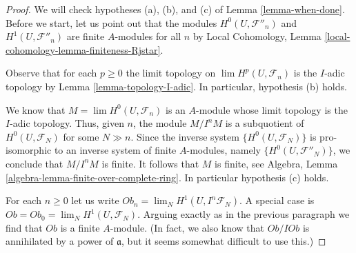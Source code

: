\begin{proof}
We will check hypotheses (a), (b), and (c) of Lemma \ref{lemma-when-done}.
Before we start, let us point out that the modules
$H^0(U, \mathcal{F}''_n)$ and $H^1(U, \mathcal{F}''_n)$
are finite $A$-modules for all $n$ by
Local Cohomology, Lemma \ref{local-cohomology-lemma-finiteness-Rjstar}.

\medskip\noindent
Observe that for each $p \geq 0$
the limit topology on $\lim H^p(U, \mathcal{F}_n)$
is the $I$-adic topology by Lemma \ref{lemma-topology-I-adic}.
In particular, hypothesis (b) holds.

\medskip\noindent
We know that $M = \lim H^0(U, \mathcal{F}_n)$ is an $A$-module whose
limit topology is the $I$-adic topology. Thus, given $n$, the module
$M/I^nM$ is a subquotient of $H^0(U, \mathcal{F}_N)$ for some $N \gg n$.
Since the inverse system $\{H^0(U, \mathcal{F}_N)\}$ is pro-isomorphic to an
inverse system of finite $A$-modules, namely $\{H^0(U, \mathcal{F}''_N)\}$,
we conclude that $M/I^nM$ is finite. It follows that $M$ is finite, see
Algebra, Lemma \ref{algebra-lemma-finite-over-complete-ring}.
In particular hypothesis (c) holds.

\medskip\noindent
For each $n \geq 0$ let us write $Ob_n = \lim_N H^1(U, I^n\mathcal{F}_N)$.
A special case is $Ob = Ob_0 = \lim_N H^1(U, \mathcal{F}_N)$.
Arguing exactly as in the previous paragraph we find that $Ob$
is a finite $A$-module. (In fact, we also know that $Ob/I Ob$ is annihilated
by a power of $\mathfrak a$, but it seems somewhat difficult to use this.)


\end{proof}
